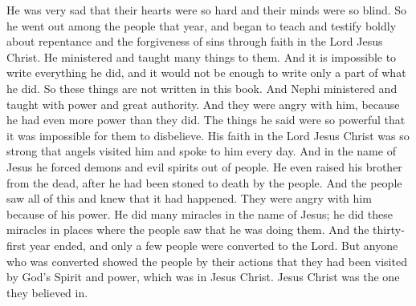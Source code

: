 He was very sad that their hearts were so hard and their minds were so blind. So he went out among the people that year, and began to teach and testify boldly about repentance and the forgiveness of sins through faith in the Lord Jesus Christ.
\bverse \iffalse And he did minister many things unto them; and all of them cannot be written, and a part of them would not suffice, therefore they are not written in this book. And Nephi did minister with power and with great authority. \fi
He ministered and taught many things to them. And it is impossible to write everything he did, and it would not be enough to write only a part of what he did. So these things are not written in this book. And Nephi ministered and taught with power and great authority.
\bverse \iffalse And it came to pass that they were angry with him, even because he had greater power than they, for it were not possible that they could disbelieve his words, for so great was his faith on the Lord Jesus Christ that angels did minister unto him daily. \fi
And they were angry with him, because he had even more power than they did. The things he said were so powerful that it was impossible for them to disbelieve. His faith in the Lord Jesus Christ was so strong that angels visited him and spoke to him every day.
\bverse \iffalse And in the name of Jesus did he cast out devils and unclean spirits; and even his brother did he raise from the dead, after he had been stoned and suffered death by the people. \fi
And in the name of Jesus he forced demons and evil spirits out of people. He even raised his brother from the dead, after he had been stoned to death by the people.
\bverse \iffalse And the people saw it, and did witness of it, and were angry with him because of his power; and he did also do many more miracles, in the sight of the people, in the name of Jesus. \fi
And the people saw all of this and knew that it had happened. They were angry with him because of his power. He did many miracles in the name of Jesus; he did these miracles in places where the people saw that he was doing them.
\bverse \iffalse And it came to pass that the thirty and first year did pass away, and there were but few who were converted unto the Lord; but as many as were converted did truly signify unto the people that they had been visited by the power and Spirit of God, which was in Jesus Christ, in whom they believed. \fi
And the thirty-first year ended, and only a few people were converted to the Lord. But anyone who was converted showed the people by their actions that they had been visited by God's Spirit and power, which was in Jesus Christ. Jesus Christ was the one they believed in.
